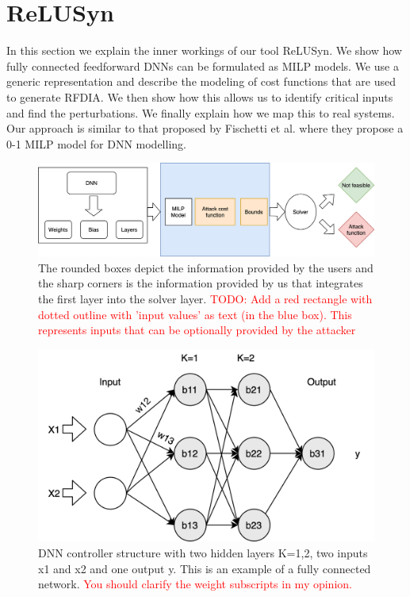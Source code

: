 \chapter{ReLUSyn}
In this section we explain the inner workings of our tool ReLUSyn. 
We show how fully connected feedforward \ac{DNN}s can be formulated as \ac{MILP} models. 
We use a generic representation and describe the modeling of cost functions that are used to generate \ac{RFDIA}.
We then show how this allows us to identify critical inputs and find the perturbations. 
We finally explain how we map this to real systems.
Our approach is similar to that proposed by Fischetti et al. \cite{fischetti2017deep} where they propose a 0-1 MILP model for DNN modelling.
\begin{figure}
	\centering
	\includegraphics[scale=0.1]{Images/Methodology}
	\caption[Methodology]{The rounded boxes depict the information provided by the users and the sharp corners is the information provided by us that integrates the first layer into the solver layer. \textcolor{red}{TODO: Add a red rectangle with dotted outline with 'input values' as text (in the blue box). This represents inputs that can be optionally provided by the attacker}}
	\label{fig:methodology}
\end{figure}

\begin{figure}
	\centering
	\includegraphics[width=0.7\linewidth]{Images/DNNstructure}
	\caption[DNN structure]{DNN controller structure with two hidden layers K=1,2, two inputs x1 and x2 and one output y. This is an example of a fully connected network. \textcolor{red}{You should clarify the weight subscripts in my opinion.}}
	\label{fig:dnn-controller}
\end{figure}


